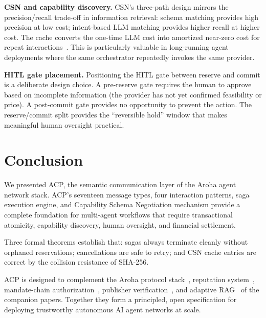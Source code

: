 \documentclass[conference]{IEEEtran}
\begin{document}
\textbf{CSN and capability discovery.}  CSN's three-path design
mirrors the precision/recall trade-off in information retrieval:
schema matching provides high precision at low cost; intent-based LLM
matching provides higher recall at higher cost.  The cache converts
the one-time LLM cost into amortized near-zero cost for repeat
interactions~\cite{lewis2020rag}.  This is particularly valuable in
long-running agent deployments where the same orchestrator repeatedly
invokes the same provider.

\textbf{HITL gate placement.}  Positioning the HITL gate between
reserve and commit is a deliberate design choice.  A pre-reserve gate
requires the human to approve based on incomplete information (the
provider has not yet confirmed feasibility or price).  A post-commit
gate provides no opportunity to prevent the action.  The
reserve/commit split provides the ``reversible hold'' window that
makes meaningful human oversight practical.

\section{Conclusion}
\label{sec:conclusion}

We presented ACP, the semantic communication layer of the Aroha
agent network stack.  ACP's seventeen message types, four interaction
patterns, saga execution engine, and Capability Schema Negotiation
mechanism provide a complete foundation for multi-agent workflows
that require transactional atomicity, capability discovery, human
oversight, and financial settlement.

Three formal theorems establish that: sagas always terminate cleanly
without orphaned reservations; cancellations are safe to retry; and
CSN cache entries are correct by the collision resistance of SHA-256.

ACP is designed to complement the Aroha protocol stack~\cite{aroha2025p5},
reputation system~\cite{aroha2025p1}, mandate-chain
authorization~\cite{aroha2025p2}, publisher verification~\cite{aroha2025p3},
and adaptive RAG~\cite{aroha2025p4} of the companion papers.
Together they form a principled, open specification for deploying
trustworthy autonomous AI agent networks at scale.



\end{document}
